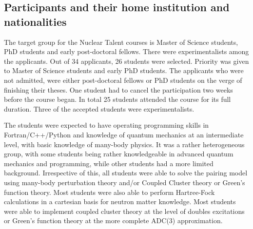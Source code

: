 \documentclass[prc,amsart,english]{revtex4}
\begin{document}
\subsection{Participants and their home institution and nationalities}

The target group for the Nuclear Talent courses is Master of Science students, PhD students and early post-doctoral fellows.
There were  experimentalists among the applicants. Out of 34 applicants, 26 students were selected. Priority was given
to Master of Science students and early PhD students. The applicants who were not admitted, were either post-doctoral 
fellows or PhD students on the verge of finishing their theses. One student had to cancel the participation two weeks before the course began.
In total 25 students attended the course for its full duration. Three of the accepted students were experimentalists. 

The students were expected to have operating programming skills in Fortran/C++/Python and knowledge of
quantum mechanics at an intermediate level, with basic knowledge of 
many-body physics. It was a rather heterogeneous group, with some students being rather knowledgeable in advanced quantum mechanics
and programming, while other students had a more limited background. Irrespective of this, all students were able to solve the pairing 
model using many-body perturbation theory and/or Coupled Cluster theory or Green's function theory. Most students were also able to 
perform Hartree-Fock calculations in a cartesian basis for neutron matter
knowledge.  Most students were able to implement coupled cluster theory at the level of doubles excitations or Green's function theory at the more complete ADC(3) approximation. 
\end{document}
